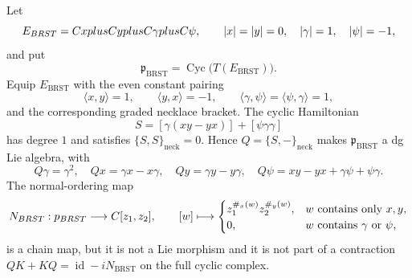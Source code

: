 \documentclass[11pt]{memoir}
\begin{document}
\begin{thm}
\label{thm:gauge-brst-cyclic-obstruction}
  Let
  \[
    E_{BRST}
      =C xplusC yplusC\gamma plusC\psi,
      \qquad |x|=|y|=0,\quad |\gamma|=1,\quad |\psi|=-1,
  \]
  and put
  \[
    \mathfrak p_{\mathrm{BRST}}
      =\operatorname{Cyc}\bigl(T(E_{\mathrm{BRST}})\bigr).
  \]
  Equip \(E_{\mathrm{BRST}}\) with the even constant pairing
  \[
    \langle x,y\rangle=1,\qquad \langle y,x\rangle=-1,\qquad
    \langle\gamma,\psi\rangle=\langle\psi,\gamma\rangle=1,
  \]
  and the corresponding graded necklace bracket.  The cyclic Hamiltonian
  \[
    S=[\gamma(xy-yx)]+[\psi\gamma\gamma]
  \]
  has degree \(1\) and satisfies \(\{S,S\}_{\mathrm{neck}}=0\).  Hence
  \(Q=\{S,-\}_{\mathrm{neck}}\) makes
  \(\mathfrak p_{\mathrm{BRST}}\) a dg Lie algebra, with
  \[
    Q\gamma=\gamma^2,\quad Qx=\gamma x-x\gamma,\quad
    Qy=\gamma y-y\gamma,\quad
    Q\psi=xy-yx+\gamma\psi+\psi\gamma .
  \]
  The normal-ordering map
  \[
    N_{BRST}:p_{BRST}\longrightarrow
    C[z_1,z_2],
    \qquad
    [w]\longmapsto
    \begin{cases}
      z_1^{\#_x(w)}z_2^{\#_y(w)},&w\text{ contains only }x,y,\\
      0,&w\text{ contains }\gamma\text{ or }\psi,
    \end{cases}
  \]
  is a chain map, but it is not a Lie morphism and it is not part of a
  contraction \(QK+KQ=\operatorname{id}-iN_{\mathrm{BRST}}\) on the full
  cyclic complex.
\end{thm}
\end{document}
